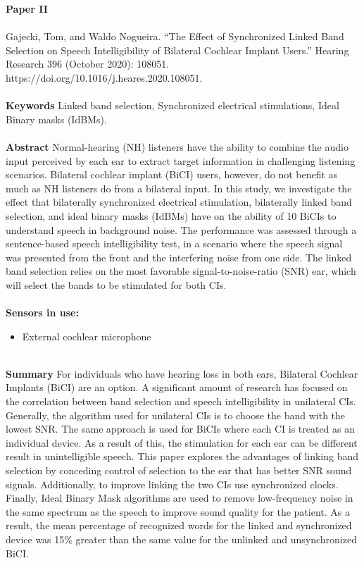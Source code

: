 
\textbf{Paper II} 
\\ \\
\noindent
Gajecki, Tom, and Waldo Nogueira. “The Effect of Synchronized Linked Band Selection on Speech Intelligibility of Bilateral Cochlear Implant Users.” Hearing Research 396 (October 2020): 108051. https://doi.org/10.1016/j.heares.2020.108051. \\ \\

\noindent
\textbf{Keywords} Linked band selection, Synchronized electrical stimulations, Ideal Binary masks (IdBMs). \\ \\

\noindent
\textbf{Abstract} Normal-hearing (NH) listeners have the ability to combine the audio input perceived by each ear to extract target information in challenging listening scenarios. Bilateral cochlear implant (BiCI) users, however, do not beneﬁt as much as NH listeners do from a bilateral input. In this study, we investigate the effect that bilaterally synchronized electrical stimulation, bilaterally linked band selection, and ideal binary masks (IdBMs) have on the ability of 10 BiCIs to understand speech in background noise. The performance was assessed through a sentence-based speech intelligibility test, in a scenario where the speech signal was presented from the front and the interfering noise from one side. The linked band selection relies on the most favorable signal-to-noise-ratio (SNR) ear, which will select the bands to be stimulated for both CIs. \\ \\

\noindent
\textbf{Sensors in use:}
\begin{itemize}
    \item External cochlear microphone \\ \\
\end{itemize}

\noindent
\textbf{Summary} For individuals who have hearing loss in both ears, Bilateral Cochlear Implants (BiCI) are an option. A significant amount of research has focused on the correlation between band selection and speech intelligibility in unilateral CIs. Generally, the algorithm used for unilateral CIs is to choose the band with the lowest SNR. The same approach is used for BiCIs where each CI is treated as an individual device. As a result of this, the stimulation for each ear can be different result in unintelligible speech. This paper explores the advantages of linking band selection by conceding control of selection to the ear that has better SNR sound signals. Additionally, to improve linking the two CIs use synchronized clocks. Finally, Ideal Binary Mask algorithms are used to remove low-frequency noise in the same spectrum as the speech to improve sound quality for the patient. As a result, the mean percentage of recognized words for the linked and synchronized device was 15\% greater than the same value for the unlinked and unsynchronized BiCI.\\ \\

